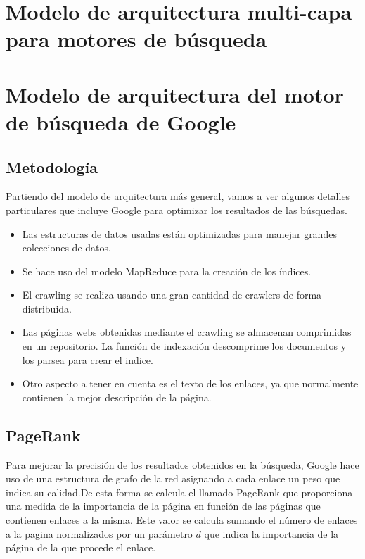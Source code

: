 \documentclass[a4paper, 11pt]{article} %
\begin{document}
	\section{Modelo de arquitectura multi-capa para motores de búsqueda}

	\section{Modelo de arquitectura del motor de búsqueda de Google}
		\subsection{Metodología}
		Partiendo del modelo de arquitectura más general, vamos a ver algunos detalles particulares que incluye Google para optimizar los resultados de las búsquedas.
		\begin{itemize}
			\item Las estructuras de datos usadas están optimizadas para manejar grandes colecciones de datos.
			\item Se hace uso del modelo MapReduce para la creación de los índices.
			\item El crawling se realiza usando una gran cantidad de crawlers de forma distribuida.
			\item Las páginas webs obtenidas mediante el crawling se almacenan comprimidas en un repositorio. La función de indexación descomprime los documentos y los parsea para crear el indice.
			\item Otro aspecto a tener en cuenta es el texto de los enlaces, ya que normalmente contienen la mejor descripción de la página.
		\end{itemize}
		
		
		\subsection{PageRank}
		Para mejorar la precisión de los resultados obtenidos en la búsqueda, Google hace uso de una estructura de grafo de la red asignando a cada enlace un peso que indica su calidad.De esta forma se calcula el llamado PageRank que proporciona una medida de la importancia de la página en función de las páginas que contienen enlaces a la misma. Este valor se calcula sumando el número de enlaces a la pagina normalizados por un parámetro $d$ que indica la importancia de la página de la que procede el enlace.
\end{document}
